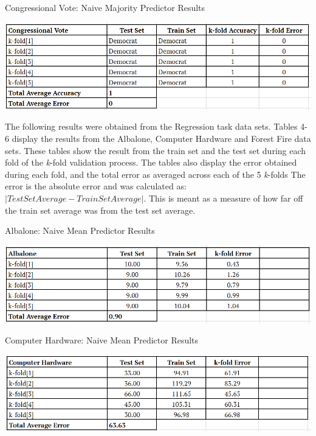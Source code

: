 \documentclass[twoside,11pt]{article}
\begin{document}
\begin{table}[h!]
	\begin{center}
		\caption{Congressional Vote: Naive Majority Predictor Results}
		\label{tab:table3}
		\includegraphics[scale=.6]{CV_Results}\newline
	\end{center}
\end{table}
\newpage

The following results were obtained from the Regression task data sets. Tables 4-6 display the results from the Albalone, Computer Hardware and Forest Fire data sets. These tables show the result from the train set and the test set during each fold of the \textit{k}-fold validation process.  The tables also display the error obtained during each fold, and the total error as averaged across each of the 5 \textit{k}-folds The error is the absolute error and was calculated as: $| Test Set Average - Train Set Average|$. This is meant as a measure of how far off the train set average was from the test set average. 

\begin{table}[h!]
	\begin{center}
		\caption{Albalone: Naive Mean Predictor Results}
		\label{tab:table4}
		\includegraphics[scale=.6]{AB_Results}\newline
	\end{center}
\end{table}

\begin{table}[h!]
	\begin{center}
		\caption{Computer Hardware: Naive Mean Predictor Results}
		\label{tab:table5}
		\includegraphics[scale=.6]{CH_Results}\newline
	\end{center}
\end{table}
\end{document}
